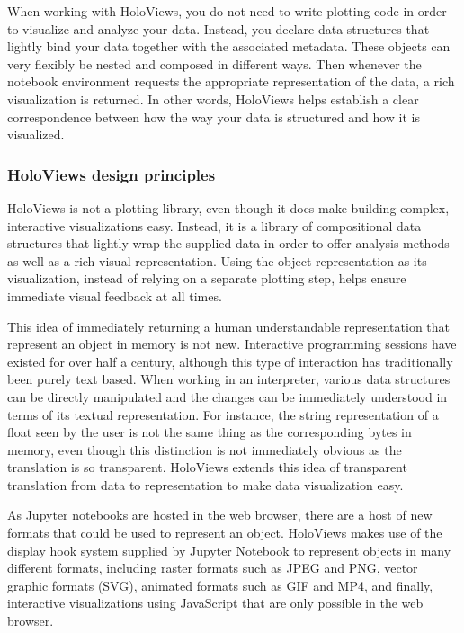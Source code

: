\documentclass[phd,ianc,twoside]{infthesis}
\begin{document}
When working with HoloViews, you do not need to write plotting code in
order to visualize and analyze your data. Instead, you declare data
structures that lightly bind your data together with the associated
metadata. These objects can very flexibly be nested and composed in different ways.
Then whenever the notebook environment requests the appropriate representation of
the data, a rich visualization is returned. In other words, HoloViews
helps establish a clear correspondence between how the way your data is
structured and how it is visualized.


\subsubsection*{HoloViews design principles}

HoloViews is not a plotting library, even though it does make building
complex, interactive visualizations easy. Instead, it is a library of
compositional data structures that lightly wrap the supplied data in
order to offer analysis methods as well as a rich visual
representation. Using the object representation as its visualization,
instead of relying on a separate plotting step, helps ensure immediate
visual feedback at all times.

This idea of immediately returning a human understandable representation
that represent an object in memory is not new. Interactive programming
sessions have existed for over half a century, although this type of
interaction has traditionally been purely text based. When working in an
interpreter, various data structures can be directly manipulated and the
changes can be immediately understood in terms of its textual
representation. For instance, the string representation of a float seen
by the user is not the same thing as the corresponding bytes in memory,
even though this distinction is not immediately obvious as the
translation is so transparent. HoloViews extends this idea of
transparent translation from data to representation to make data
visualization easy.

As Jupyter notebooks are hosted in the web browser, there are a host of
new formats that could be used to represent an object. HoloViews makes
use of the display hook system supplied by Jupyter Notebook to represent
objects in many different formats, including raster formats such as JPEG
and PNG, vector graphic formats (SVG), animated formats such as GIF and
MP4, and finally, interactive visualizations using JavaScript that are
only possible in the web browser.
\end{document}
